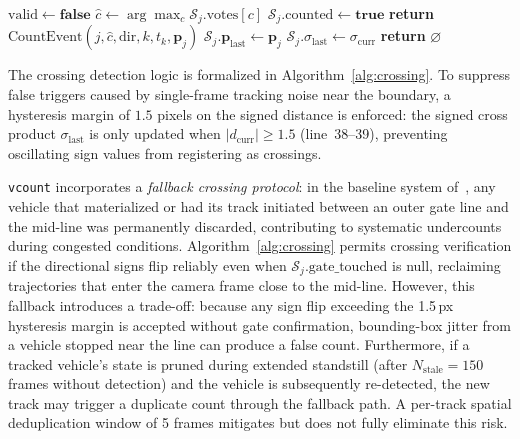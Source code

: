 \begin{algorithm}[t]
\begin{algorithmic}[1]
    \ELSE
        \STATE $\text{valid} \leftarrow \mathbf{false}$
    \ENDIF
        \STATE $\hat{c} \leftarrow \arg\max_{c} \mathcal{S}_j.\text{votes}[c]$
        \STATE $\mathcal{S}_j.\text{counted} \leftarrow \mathbf{true}$
        \STATE \textbf{return} $\text{CountEvent}(j, \hat{c}, \text{dir}, k, t_k, \mathbf{p}_j)$
    \ENDIF
\ENDIF
\STATE $\mathcal{S}_j.\mathbf{p}_{\text{last}} \leftarrow \mathbf{p}_j$
    \STATE $\mathcal{S}_j.\sigma_{\text{last}} \leftarrow \sigma_{\text{curr}}$
\ENDIF
\STATE \textbf{return} $\varnothing$
\end{algorithmic}
\end{algorithm}

The crossing detection logic is formalized in Algorithm~\ref{alg:crossing}. To suppress false triggers caused by single-frame tracking noise near the boundary, a hysteresis margin of $1.5$ pixels on the signed distance is enforced: the signed cross product $\sigma_{\text{last}}$ is only updated when $|d_{\text{curr}}| \ge 1.5$ (line~38--39), preventing oscillating sign values from registering as crossings.

\texttt{vcount} incorporates a \textit{fallback crossing protocol}: in the baseline system of~\cite{majumder2023automated}, any vehicle that materialized or had its track initiated between an outer gate line and the mid-line was permanently discarded, contributing to systematic undercounts during congested conditions. Algorithm~\ref{alg:crossing} permits crossing verification if the directional signs flip reliably even when $\mathcal{S}_j.\text{gate\_touched}$ is null, reclaiming trajectories that enter the camera frame close to the mid-line. However, this fallback introduces a trade-off: because any sign flip exceeding the 1.5\,px hysteresis margin is accepted without gate confirmation, bounding-box jitter from a vehicle stopped near the line can produce a false count. Furthermore, if a tracked vehicle's state is pruned during extended standstill (after $N_{\text{stale}} = 150$ frames without detection) and the vehicle is subsequently re-detected, the new track may trigger a duplicate count through the fallback path. A per-track spatial deduplication window of 5 frames mitigates but does not fully eliminate this risk.

